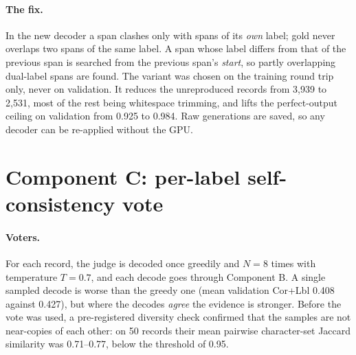 \paragraph{The fix.}
In the new decoder a span clashes only with spans of its \emph{own} label; gold never overlaps two spans of the same label. A span whose label differs from that of the previous span is searched from the previous span's \emph{start}, so partly overlapping dual-label spans are found. The variant was chosen on the training round trip only, never on validation. It reduces the unreproduced records from 3,939 to 2,531, most of the rest being whitespace trimming, and lifts the perfect-output ceiling on validation from 0.925 to 0.984. Raw generations are saved, so any decoder can be re-applied without the GPU.

\section{Component C: per-label self-consistency vote}\label{sec:vote}

\paragraph{Voters.}
For each record, the judge is decoded once greedily and $N = 8$ times with temperature $T = 0.7$, and each decode goes through Component B. A single sampled decode is worse than the greedy one (mean validation Cor+Lbl 0.408 against 0.427), but where the decodes \emph{agree} the evidence is stronger. Before the vote was used, a pre-registered diversity check confirmed that the samples are not near-copies of each other: on 50 records their mean pairwise character-set Jaccard similarity was 0.71--0.77, below the threshold of 0.95.

